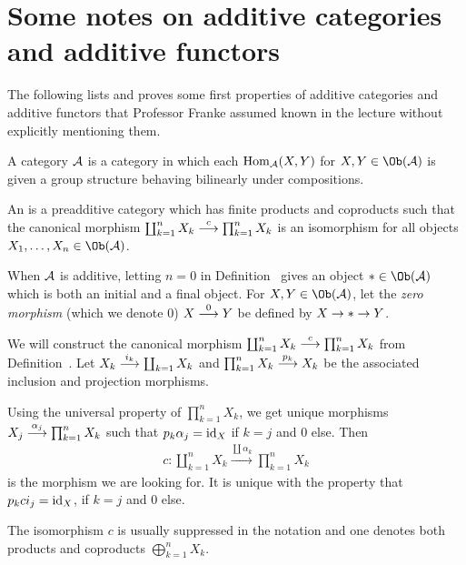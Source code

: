 \documentclass[a4paper,parskip=half,numbers=enddot, DIV=12]{scrreprt}
\begin{document}
\section{Some notes on additive categories and additive functors}
The following lists and proves some first properties of additive categories and additive functors that Professor Franke assumed known in the lecture without explicitly mentioning them.
\begin{defi}
	\begin{alphanumerate}
		\item {}A  category $\mathcal{A}$ is a category in which each $\operatorname{Hom}_{\mathcal{A}}(X,Y)$ for $X,Y\in\Ob(\Aa)$ is given a group structure behaving bilinearly under compositions.
		\item An  is a preadditive category which has finite products and coproducts such that the canonical morphism $\coprod_{k=1}^nX_k\morphism[c] \prod_{k=1}^{n}X_k$ is an isomorphism for all objects $X_1,\ldots,X_n\in\Ob(\Aa)$.
	\end{alphanumerate}
\end{defi}
\begin{rem*}
	\begin{alphanumerate}
		\item When $\mathcal{A}$ is additive, letting $n=0$ in Definition~ gives an object $*\in\Ob(\Aa)$ which is both an initial and a final object. For $X,Y\in\Ob(\Aa)$, let the \emph{zero morphism} (which we denote $0$) $X\morphism[0]Y$ be defined by $X\morphism *\morphism Y$.
		\item We will construct the canonical morphism $\coprod_{k=1}^nX_k\morphism[c] \prod_{k=1}^{n}X_k$ from Definition~. Let $X_k\morphism[i_k]\coprod_{k=1}X_k$ and $\prod_{k=1}^nX_k\morphism[p_k]X_k$ be the associated inclusion and projection morphisms.
		
		Using the universal property of $\prod_{k=1}^{n}X_k$, we get unique morphisms $X_j\morphism[\alpha_j]\prod_{k=1}^{n}X_k$ such that $p_k\alpha_j=\operatorname{id}_X$ if $k=j$ and $0$ else. Then 
		\begin{align*}
		c\colon \coprod_{k=1}^nX_k\xrightarrow{\coprod\alpha_k}\prod_{k=1}^{n}X_k
		\end{align*}
		is the morphism we are looking for. It is unique with the property that $p_k c i_j=\operatorname{id}_X$, if $k=j$ and $0$ else.
		\item The isomorphism $c$ is usually suppressed in the notation and one denotes both products and coproducts $\bigoplus_{k=1}^nX_k$.
	\end{alphanumerate}
\end{rem*}
\end{document}

